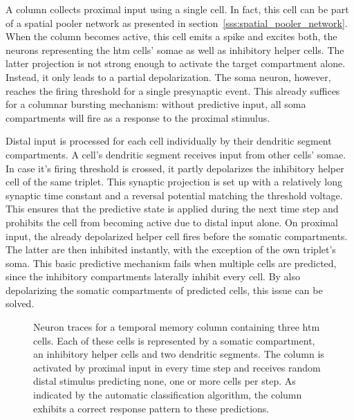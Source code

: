 A column collects proximal input using a single cell. In fact, this cell can be part of a spatial pooler network as presented in section~\ref{sss:spatial_pooler_network}. When the column becomes active, this cell emits a spike and excites both, the neurons representing the \gls{htm} cells' somae as well as inhibitory helper cells. The latter projection is not strong enough to activate the target compartment alone. Instead, it only leads to a partial depolarization. The soma neuron, however, reaches the firing threshold for a single presynaptic event. This already suffices for a columnar bursting mechanism: without predictive input, all soma compartments will fire as a response to the proximal stimulus.

Distal input is processed for each cell individually by their dendritic segment compartments. A cell's dendritic segment receives input from other cells' somae. In case it's firing threshold is crossed, it partly depolarizes the inhibitory helper cell of the same triplet. This synaptic projection is set up with a relatively long synaptic time constant and a reversal potential matching the threshold voltage. This ensures that the predictive state is applied during the next time step and prohibits the cell from becoming active due to distal input alone. On proximal input, the already depolarized helper cell fires before the somatic compartments. The latter are then inhibited instantly, with the exception of the own triplet's soma. This basic predictive mechanism fails when multiple cells are predicted, since the inhibitory compartments laterally inhibit every cell. By also depolarizing the somatic compartments of predicted cells, this issue can be solved.

\begin{figure}
	\begin{center}
		
	\end{center}
	\caption{Neuron traces for a temporal memory column containing three \gls{htm} cells. Each of these cells is represented by a somatic compartment, an inhibitory helper cells and two dendritic segments. The column is activated by proximal input in every time step and receives random distal stimulus predicting none, one or more cells per step. As indicated by the automatic classification algorithm, the column exhibits a correct response pattern to these predictions.}
	\label{fig:static_temporal_memory_traces}
\end{figure}
